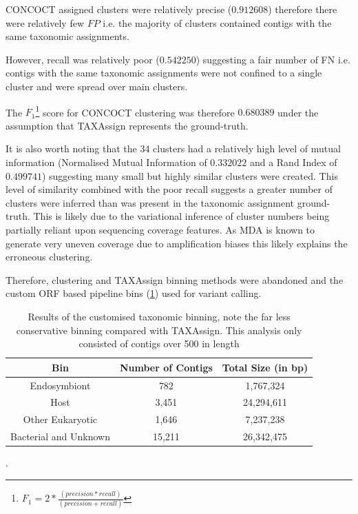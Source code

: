 CONCOCT assigned clusters were relatively precise (\(0.912608\))
therefore there were relatively few \(FP\) i.e. the majority of clusters 
contained contigs with the same taxonomic assignments. 

However, recall was relatively poor (\(0.542250\)) suggesting a
fair number of FN i.e. contigs with the same taxonomic assignments
were not confined to a single cluster and were spread over main clusters.

The \(F_1\)\footnote{\(F_1 = 2 * \frac{(precision * recall)}{(precision + recall)}\)} score for CONCOCT 
clustering was therefore \(0.680389\) under the assumption that 
TAXAssign represents the ground-truth. 

It is also worth noting that the 34 clusters had a relatively high level of mutual information
(Normalised Mutual Information of \(0.332022\) and a Rand Index of \(0.499741\)) suggesting
many small but highly similar clusters were created.  This level of similarity combined
with the poor recall suggests a greater number of clusters were inferred than was
present in the taxonomic assignment ground-truth.  This is likely due to
the variational inference of cluster numbers being partially reliant upon
sequencing coverage features.  As MDA is known to generate very uneven coverage 
due to amplification biases this likely explains the erroneous clustering.


Therefore, clustering and TAXAssign binning methods were abandoned and
the custom ORF based pipeline bins (\cref{tab:custom_tax_bin}) used
for variant calling.

\begin{table}
    \centering
    \begin{tabular}{|c|c|c|}
        \hline
        \textbf{Bin} & \textbf{Number of Contigs} & \textbf{Total Size (in \si{bp})} \\
        \hline
        Endosymbiont & 782 & 1,767,324\\
        Host & 3,451 &  24,294,611 \\
        \hline
        Other Eukaryotic & 1,646 & 7,237,238\\
        Bacterial and Unknown & 15,211 & 26,342,475 \\
        \hline
    \end{tabular}
    \caption[Custom taxonomic binning results]{Results of the customised taxonomic binning,
    note the far less conservative binning compared with TAXAssign. This analysis only
    consisted of contigs over \SI{500}{\bp} in length}.
\label{tab:custom_tax_bin}
\end{table}


